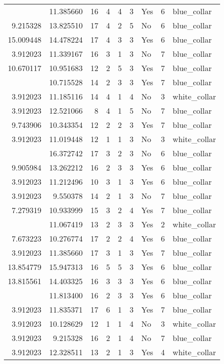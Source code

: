 \documentclass[
]{article}
\begin{document}
\begin{longtable}[t]{rrrrrllrl}
\addlinespace
9.743906 & 11.385660 & 16 & 4 & 4 & 3 & Yes & 6 & blue\_collar\\
9.215328 & 13.825510 & 17 & 4 & 2 & 5 & No & 6 & blue\_collar\\
15.009448 & 14.478224 & 17 & 4 & 3 & 3 & Yes & 6 & blue\_collar\\
3.912023 & 11.339167 & 16 & 3 & 1 & 3 & No & 7 & blue\_collar\\
10.670117 & 10.951683 & 12 & 2 & 5 & 3 & Yes & 7 & blue\_collar\\
\addlinespace
7.625595 & 10.715528 & 14 & 2 & 3 & 3 & Yes & 7 & blue\_collar\\
3.912023 & 11.185116 & 14 & 4 & 1 & 4 & No & 3 & white\_collar\\
3.912023 & 12.521066 & 8 & 4 & 1 & 5 & No & 7 & blue\_collar\\
9.743906 & 10.343354 & 12 & 2 & 2 & 3 & Yes & 7 & blue\_collar\\
3.912023 & 11.019448 & 12 & 1 & 1 & 3 & No & 3 & white\_collar\\
\addlinespace
13.845118 & 16.372742 & 17 & 3 & 2 & 3 & No & 6 & blue\_collar\\
9.905984 & 13.262212 & 16 & 2 & 3 & 3 & Yes & 6 & blue\_collar\\
3.912023 & 11.212496 & 10 & 3 & 1 & 3 & Yes & 6 & blue\_collar\\
3.912023 & 9.550378 & 14 & 2 & 1 & 3 & No & 7 & blue\_collar\\
7.279319 & 10.933999 & 15 & 3 & 2 & 4 & Yes & 7 & blue\_collar\\
\addlinespace
9.017969 & 11.067419 & 13 & 2 & 3 & 3 & Yes & 2 & white\_collar\\
7.673223 & 10.276774 & 17 & 2 & 2 & 4 & Yes & 6 & blue\_collar\\
3.912023 & 11.385660 & 17 & 3 & 1 & 3 & Yes & 7 & blue\_collar\\
13.854779 & 15.947313 & 16 & 5 & 5 & 3 & Yes & 6 & blue\_collar\\
13.815561 & 14.403325 & 16 & 3 & 3 & 3 & Yes & 6 & blue\_collar\\
\addlinespace
10.001068 & 11.813400 & 16 & 2 & 3 & 3 & Yes & 6 & blue\_collar\\
3.912023 & 11.835371 & 17 & 6 & 1 & 3 & Yes & 7 & blue\_collar\\
3.912023 & 10.128629 & 12 & 1 & 1 & 4 & No & 3 & white\_collar\\
3.912023 & 9.215328 & 16 & 2 & 1 & 4 & No & 7 & blue\_collar\\
3.912023 & 12.328511 & 13 & 2 & 1 & 3 & Yes & 4 & white\_collar\\

\end{longtable}
\end{document}
